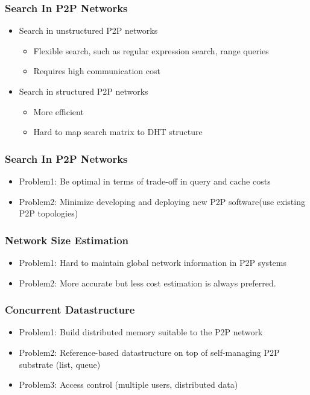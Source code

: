 \documentclass[red]{beamer}
\begin{document}
\iffalse
\begin{frame}
\frametitle{Search In P2P Networks}
\begin{itemize}
\item Search in unstructured P2P networks
\begin{itemize}
\item Flexible search, such as regular expression search, range queries
\item Requires high communication cost
\end{itemize} 
\item Search in structured P2P networks
\begin{itemize}
\item More efficient
\item Hard to map search matrix to DHT structure
\end{itemize}
\end{itemize}
\end{frame}
\begin{frame}
\frametitle{Search In P2P Networks}
\begin{itemize}
\item Problem1: Be optimal in terms of trade-off in query and cache costs
\item Problem2: Minimize developing and deploying new P2P software(use existing P2P topologies)
\end{itemize}
\end{frame}
\begin{frame}
\frametitle{Network Size Estimation}
\begin{itemize}
\item Problem1: Hard to maintain global network information in P2P systems
\item Problem2: More accurate but less cost estimation is always preferred. 
\end{itemize}
\end{frame}
\begin{frame}
\frametitle{Concurrent Datastructure}
\begin{itemize}
\item Problem1: Build distributed memory suitable to the P2P network
\item Problem2: Reference-based datastructure on top of self-managing P2P substrate (list, queue)
\item Problem3: Access control (multiple users, distributed data)
\end{itemize}
\end{frame}
\end{document}
